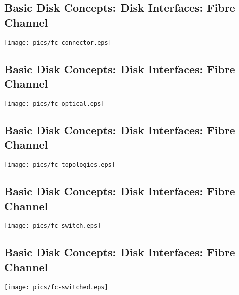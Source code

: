 \documentclass[xga]{xdvislides}
\begin{document}

\subsection{Basic Disk Concepts: Disk Interfaces: Fibre Channel}
\vfill
	\begin{center}
		\texttt{[image: pics/fc-connector.eps]} \\
	\end{center}
\vfill

\subsection{Basic Disk Concepts: Disk Interfaces: Fibre Channel}
\vfill
	\begin{center}
		\texttt{[image: pics/fc-optical.eps]} \\
	\end{center}
\vfill

\subsection{Basic Disk Concepts: Disk Interfaces: Fibre Channel}
\vfill
	\begin{center}
		\texttt{[image: pics/fc-topologies.eps]} \\
	\end{center}
\vfill

\subsection{Basic Disk Concepts: Disk Interfaces: Fibre Channel}
\vfill
	\begin{center}
		\texttt{[image: pics/fc-switch.eps]} \\
	\end{center}
\vfill

\subsection{Basic Disk Concepts: Disk Interfaces: Fibre Channel}
\vfill
	\begin{center}
		\texttt{[image: pics/fc-switched.eps]} \\
	\end{center}
\vfill

\end{document}

